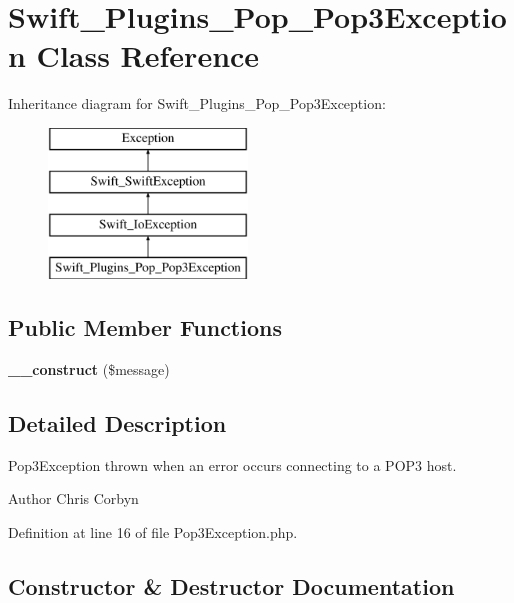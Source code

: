 \section{Swift\+\_\+\+Plugins\+\_\+\+Pop\+\_\+\+Pop3\+Exception Class Reference}
\label{class_swift___plugins___pop___pop3_exception}
Inheritance diagram for Swift\+\_\+\+Plugins\+\_\+\+Pop\+\_\+\+Pop3\+Exception\+:\begin{figure}[H]
\begin{center}
\leavevmode
\includegraphics[height=4.000000cm]{class_swift___plugins___pop___pop3_exception}
\end{center}
\end{figure}
\subsection*{Public Member Functions}
\begin{DoxyCompactItemize}
\item 
{\bf \+\_\+\+\_\+construct} (\$message)
\end{DoxyCompactItemize}


\subsection{Detailed Description}
Pop3\+Exception thrown when an error occurs connecting to a P\+O\+P3 host.

\begin{DoxyAuthor}{Author}
Chris Corbyn 
\end{DoxyAuthor}


Definition at line 16 of file Pop3\+Exception.\+php.



\subsection{Constructor \& Destructor Documentation}
